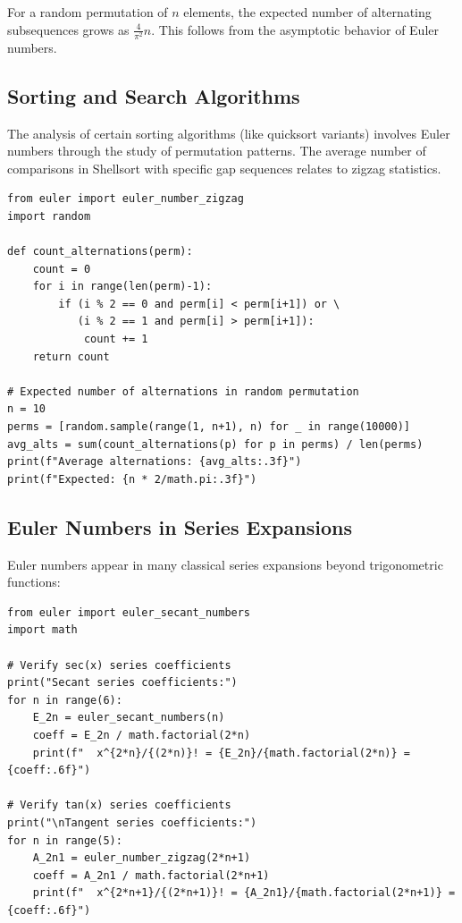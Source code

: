For a random permutation of $n$ elements, the expected number of alternating
subsequences grows as $\frac{4}{\pi^2} n$. This follows from the asymptotic
behavior of Euler numbers.

\subsection{Sorting and Search Algorithms}

The analysis of certain sorting algorithms (like quicksort variants) involves
Euler numbers through the study of permutation patterns. The average number
of comparisons in Shellsort with specific gap sequences relates to zigzag statistics.

\begin{lstlisting}[caption={Analyzing random permutations}, label=lst:rand_perm]
from euler import euler_number_zigzag
import random

def count_alternations(perm):
    count = 0
    for i in range(len(perm)-1):
        if (i % 2 == 0 and perm[i] < perm[i+1]) or \
           (i % 2 == 1 and perm[i] > perm[i+1]):
            count += 1
    return count

# Expected number of alternations in random permutation
n = 10
perms = [random.sample(range(1, n+1), n) for _ in range(10000)]
avg_alts = sum(count_alternations(p) for p in perms) / len(perms)
print(f"Average alternations: {avg_alts:.3f}")
print(f"Expected: {n * 2/math.pi:.3f}")
\end{lstlisting}

\subsection{Euler Numbers in Series Expansions}

Euler numbers appear in many classical series expansions beyond trigonometric functions:

\begin{lstlisting}[caption={Euler numbers in series}, label=lst:euler_series]
from euler import euler_secant_numbers
import math

# Verify sec(x) series coefficients
print("Secant series coefficients:")
for n in range(6):
    E_2n = euler_secant_numbers(n)
    coeff = E_2n / math.factorial(2*n)
    print(f"  x^{2*n}/{(2*n)}! = {E_2n}/{math.factorial(2*n)} = {coeff:.6f}")

# Verify tan(x) series coefficients  
print("\nTangent series coefficients:")
for n in range(5):
    A_2n1 = euler_number_zigzag(2*n+1)
    coeff = A_2n1 / math.factorial(2*n+1)
    print(f"  x^{2*n+1}/{(2*n+1)}! = {A_2n1}/{math.factorial(2*n+1)} = {coeff:.6f}")
\end{lstlisting}

